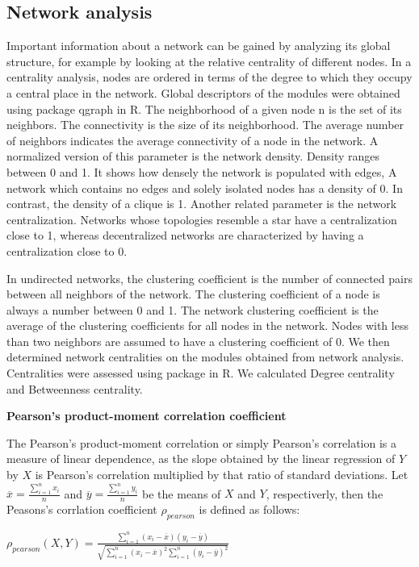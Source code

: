 \documentclass[a4paper]{article}
\begin{document}
\subsection*{Network analysis}
Important information about a network can be gained by analyzing its global structure, for example by looking at the relative centrality of different nodes. In a centrality analysis, nodes are ordered in terms of the degree to which they occupy a central place in the network. Global descriptors of the modules were obtained using package qgraph in R. The neighborhood of a given node n is the set of its neighbors. The connectivity is the size of its neighborhood. The average number of neighbors indicates the average connectivity of a node in the network. A normalized version of this parameter is the network density. Density ranges between 0 and 1. It shows how densely the network is populated with edges, A network which contains no edges and solely isolated nodes has a density of 0. In contrast, the density of a clique is 1. Another related parameter is the network centralization. Networks whose topologies resemble a star have a centralization close to 1, whereas decentralized networks are characterized by having a centralization close to 0.

In undirected networks, the clustering coefficient is the number of connected pairs between all neighbors of the network. The clustering coefficient of a node is always a number between 0 and 1. The network clustering coefficient is the average of the clustering coefficients for all nodes in the network. Nodes with less than two neighbors are assumed to have a clustering coefficient of 0. We then determined network centralities on the modules obtained from network analysis. Centralities were assessed using package in R. We calculated Degree centrality and Betweenness centrality.

\textbf{Pearson’s product-moment correlation coefficient}

The Pearson’s product-moment correlation or simply Pearson’s correlation is a measure of linear dependence, as the slope obtained by the linear regression of $Y$ by $X$ is Pearson’s correlation multiplied by that ratio of standard deviations.
Let $\overline{x} = \frac{\sum_{i=1}^{n} x_{i}}{n}$ and $\overline{y} = \frac{\sum_{i=1}^{n} y_{i}}{n}$ be the means of $X$ and $Y$, respectiverly, then the Peasons's corrlation coefficient $\rho_{pearson}$ is defined as follows: 

$\rho_{pearson}(X, Y) = \frac{\sum_{i=1}^{n}(x_{i} - \overline{x})(y_{i} - \overline{y})}
{\sqrt{\sum_{i=1}^{n}(x_{i} - \overline{x})^2  \sum_{i=1}^{n}(y_{i} - \overline{y})^2}}$
\end{document}

